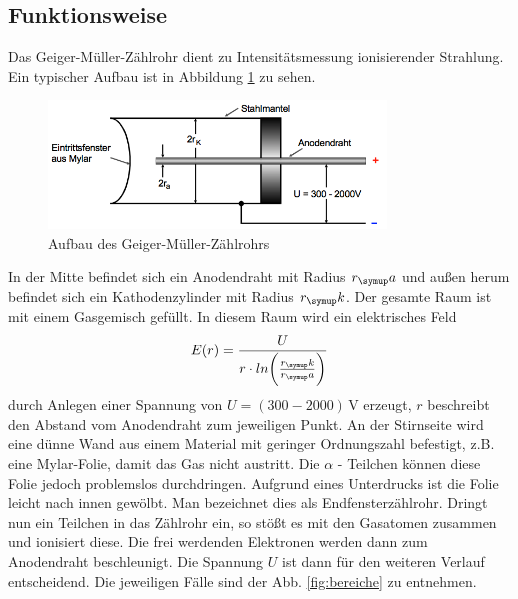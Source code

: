 \subsection{Funktionsweise}
Das Geiger-Müller-Zählrohr dient zu Intensitätsmessung ionisierender Strahlung.
Ein typischer Aufbau ist in Abbildung \ref{fig:aufbau} zu sehen.
\begin{figure}
  \centering
  \includegraphics[width=0.8\textwidth]{bilder/aufbau.png}
  \caption{Aufbau des Geiger-Müller-Zählrohrs \cite{703}
  \label{fig:aufbau}}
\end{figure}
In der Mitte befindet sich ein Anodendraht mit Radius $r_\su{a}$ und außen herum
befindet sich ein Kathodenzylinder mit Radius $r_\su{k}$. Der gesamte Raum ist mit
einem Gasgemisch gefüllt. In diesem Raum wird ein elektrisches Feld
\begin{equation}
  E(r)= \frac{U}{r \cdot ln \bigg( \frac{r_\su{k}}{r_\su{a}}\bigg)}
\end{equation}
durch Anlegen einer Spannung von $U = (300-2000) \,\si{\volt}$ erzeugt, $r$
beschreibt den Abstand vom Anodendraht zum jeweiligen Punkt.
An der Stirnseite wird eine dünne Wand aus einem Material mit geringer Ordnungszahl
befestigt, z.B. eine Mylar-Folie, damit das Gas nicht austritt. Die $\alpha$ - Teilchen
können diese Folie jedoch problemslos durchdringen. Aufgrund eines Unterdrucks ist
die Folie leicht nach innen gewölbt. Man bezeichnet dies als Endfensterzählrohr.
Dringt nun ein Teilchen in das Zählrohr ein, so stößt es mit den Gasatomen zusammen
und ionisiert diese. Die frei werdenden Elektronen werden dann zum Anodendraht
beschleunigt. Die Spannung $U$ ist dann für den weiteren Verlauf entscheidend.
Die jeweiligen Fälle sind der Abb. \ref{fig:bereiche}
zu entnehmen.
